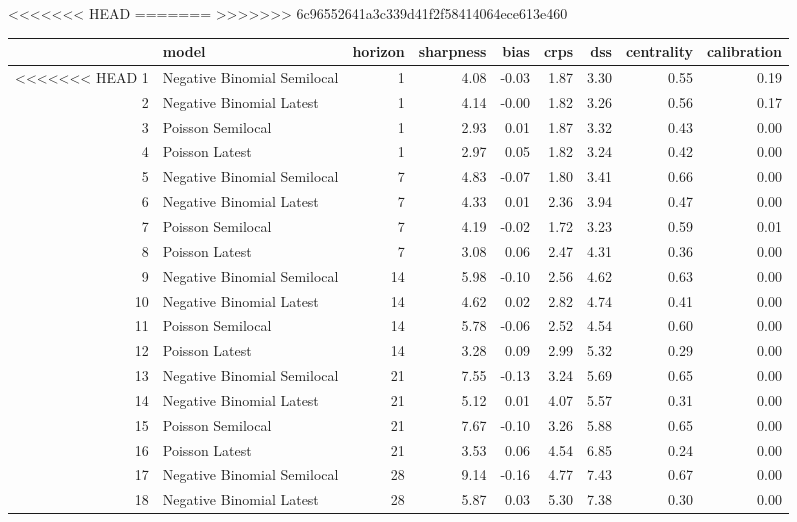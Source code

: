 <<<<<<< HEAD
=======
>>>>>>> 6c96552641a3c339d41f2f58414064ece613e460
\begin{table}[ht]
\centering
\begin{tabular}{rlrrrrrrr}
  \hline
 & model & horizon & sharpness & bias & crps & dss & centrality & calibration \\ 
  \hline
<<<<<<< HEAD
1 & Negative Binomial Semilocal &   1 & 4.08 & -0.03 & 1.87 & 3.30 & 0.55 & 0.19 \\ 
  2 & Negative Binomial Latest &   1 & 4.14 & -0.00 & 1.82 & 3.26 & 0.56 & 0.17 \\ 
  3 & Poisson Semilocal &   1 & 2.93 & 0.01 & 1.87 & 3.32 & 0.43 & 0.00 \\ 
  4 & Poisson Latest &   1 & 2.97 & 0.05 & 1.82 & 3.24 & 0.42 & 0.00 \\ 
  5 & Negative Binomial Semilocal &   7 & 4.83 & -0.07 & 1.80 & 3.41 & 0.66 & 0.00 \\ 
  6 & Negative Binomial Latest &   7 & 4.33 & 0.01 & 2.36 & 3.94 & 0.47 & 0.00 \\ 
  7 & Poisson Semilocal &   7 & 4.19 & -0.02 & 1.72 & 3.23 & 0.59 & 0.01 \\ 
  8 & Poisson Latest &   7 & 3.08 & 0.06 & 2.47 & 4.31 & 0.36 & 0.00 \\ 
  9 & Negative Binomial Semilocal &  14 & 5.98 & -0.10 & 2.56 & 4.62 & 0.63 & 0.00 \\ 
  10 & Negative Binomial Latest &  14 & 4.62 & 0.02 & 2.82 & 4.74 & 0.41 & 0.00 \\ 
  11 & Poisson Semilocal &  14 & 5.78 & -0.06 & 2.52 & 4.54 & 0.60 & 0.00 \\ 
  12 & Poisson Latest &  14 & 3.28 & 0.09 & 2.99 & 5.32 & 0.29 & 0.00 \\ 
  13 & Negative Binomial Semilocal &  21 & 7.55 & -0.13 & 3.24 & 5.69 & 0.65 & 0.00 \\ 
  14 & Negative Binomial Latest &  21 & 5.12 & 0.01 & 4.07 & 5.57 & 0.31 & 0.00 \\ 
  15 & Poisson Semilocal &  21 & 7.67 & -0.10 & 3.26 & 5.88 & 0.65 & 0.00 \\ 
  16 & Poisson Latest &  21 & 3.53 & 0.06 & 4.54 & 6.85 & 0.24 & 0.00 \\ 
  17 & Negative Binomial Semilocal &  28 & 9.14 & -0.16 & 4.77 & 7.43 & 0.67 & 0.00 \\ 
  18 & Negative Binomial Latest &  28 & 5.87 & 0.03 & 5.30 & 7.38 & 0.30 & 0.00 \\ 

\end{tabular}
\end{table}
